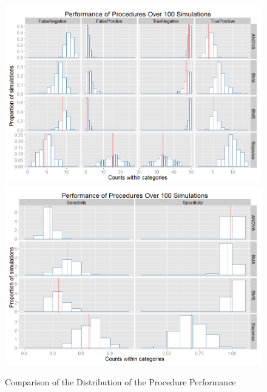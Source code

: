 \documentclass[]{article}
\begin{document}
\begin{figure}[h]
\caption{Comparison of the Distribution of the Procedure Performance}
\includegraphics[width=1.1\textwidth]{fig1.png}
\includegraphics[width=1.1\textwidth]{fig2.png}
\end{figure}
\end{document}
